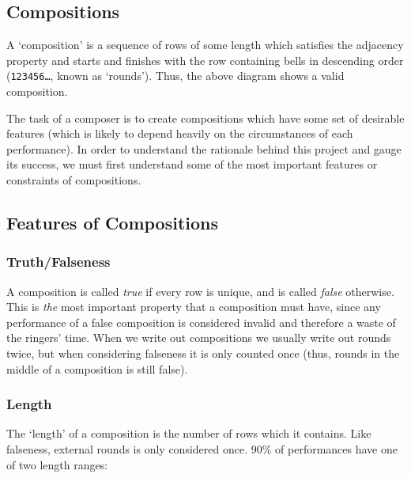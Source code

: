 \documentclass[12pt]{article}
\newcommand{\row}[1]{\texttt{#1}}
\begin{document}
\subsection{Compositions}

A `composition' is a sequence of rows of some length which satisfies the adjacency property and
starts and finishes with the row containing bells in descending order (\row{123456\ldots}, known as
`rounds').  Thus, the above diagram shows a valid composition.

The task of a composer is to create compositions which have some set of desirable features (which is
likely to depend heavily on the circumstances of each performance).  In order to understand the
rationale behind this project and gauge its success, we must first understand some of the most
important features or constraints of compositions.

\subsection{Features of Compositions}

\subsubsection{Truth/Falseness}

A composition is called \emph{true} if every row is unique, and is called \emph{false} otherwise.
This is \emph{the} most important property that a composition must have, since any performance of a
false composition is considered invalid and therefore a waste of the ringers' time.  When we write
out compositions we usually write out rounds twice, but when considering falseness it is only
counted once (thus, rounds in the middle of a composition is still false).

\subsubsection{Length}

The `length' of a composition is the number of rows which it contains.  Like falseness, external
rounds is only considered once.  90\% of performances have one of two length ranges:
\end{document}
